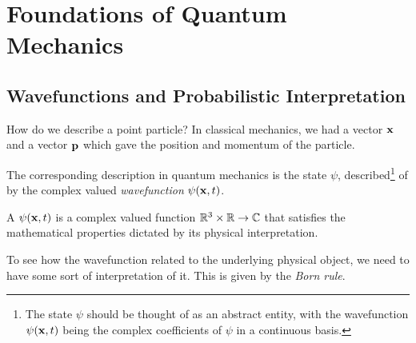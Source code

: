 \documentclass[a4paper]{scrartcl}
\begin{document}






\section{Foundations of Quantum Mechanics}

\subsection{Wavefunctions and Probabilistic Interpretation}

How do we describe a point particle? 
In classical mechanics, we had a vector $\mathbf{x}$ and a vector $\mathbf{p}$ which gave the position and momentum of the particle. 

The corresponding description in quantum mechanics is the state $\psi$, described\footnote{The state $\psi$ should be thought of as an abstract entity, with the wavefunction $\psi(\mathbf{x}, t)$ being the complex coefficients of $\psi$ in a continuous basis.} of  by the complex valued \emph{wavefunction} $\psi(\mathbf{x}, t)$. 

\begin{definition}[Wavefunction]
    A  $\psi(\mathbf{x}, t)$ is a complex valued function $\mathbb{R}^3 \times \mathbb{R} \rightarrow \mathbb{C}$ that satisfies the mathematical properties dictated by its physical interpretation.
\end{definition}

To see how the wavefunction related to the underlying physical object, we need to have some sort of interpretation of it. This is given by the \emph{Born rule}.
\end{document}
